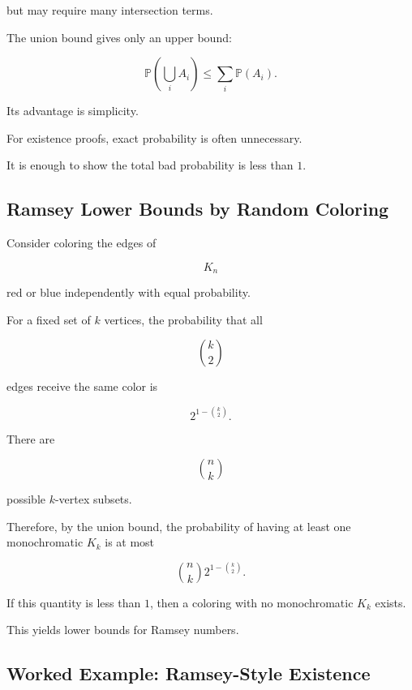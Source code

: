 but may require many intersection terms.

The union bound gives only an upper bound:

\[
\mathbb{P}\left(\bigcup_iA_i\right)
\leq
\sum_i\mathbb{P}(A_i).
\]

Its advantage is simplicity.

For existence proofs, exact probability is often unnecessary.

It is enough to show the total bad probability is less than \(1\).

\subsection{Ramsey Lower Bounds by Random Coloring}
\label{subsec:ramsey-random-coloring-preview}

Consider coloring the edges of

\[
K_n
\]

red or blue independently with equal probability.

For a fixed set of \(k\) vertices, the probability that all

\[
\binom{k}{2}
\]

edges receive the same color is

\[
\boxed{
2^{1-\binom{k}{2}}.
}
\]

There are

\[
\binom{n}{k}
\]

possible \(k\)-vertex subsets.

Therefore, by the union bound, the probability of having at least one
monochromatic \(K_k\) is at most

\[
\boxed{
\binom{n}{k}
2^{1-\binom{k}{2}}.
}
\]

If this quantity is less than \(1\), then a coloring with no
monochromatic \(K_k\) exists.

This yields lower bounds for Ramsey numbers.

\subsection{Worked Example: Ramsey-Style Existence}
\label{subsec:worked-ramsey-probabilistic}

